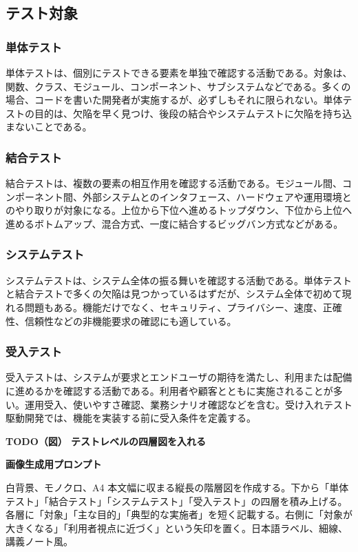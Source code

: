 \documentclass[uplatex,dvipdfmx,a4paper,11pt,nomag]{jsarticle}
\newenvironment{todobox}[2]{\par\medskip\begin{framed}\noindent\textbf{TODO（図） #1}\par\smallskip\noindent\textbf{画像生成用プロンプト}\par\smallskip\noindent #2\par\smallskip}{\end{framed}\par\medskip}
\begin{document}
\subsection{テスト対象}
\subsubsection{単体テスト}
単体テストは、個別にテストできる要素を単独で確認する活動である。対象は、関数、クラス、モジュール、コンポーネント、サブシステムなどである。多くの場合、コードを書いた開発者が実施するが、必ずしもそれに限られない。単体テストの目的は、欠陥を早く見つけ、後段の結合やシステムテストに欠陥を持ち込まないことである。

\subsubsection{結合テスト}
結合テストは、複数の要素の相互作用を確認する活動である。モジュール間、コンポーネント間、外部システムとのインタフェース、ハードウェアや運用環境とのやり取りが対象になる。上位から下位へ進めるトップダウン、下位から上位へ進めるボトムアップ、混合方式、一度に結合するビッグバン方式などがある。

\subsubsection{システムテスト}
システムテストは、システム全体の振る舞いを確認する活動である。単体テストと結合テストで多くの欠陥は見つかっているはずだが、システム全体で初めて現れる問題もある。機能だけでなく、セキュリティ、プライバシー、速度、正確性、信頼性などの非機能要求の確認にも適している。

\subsubsection{受入テスト}
受入テストは、システムが要求とエンドユーザの期待を満たし、利用または配備に進めるかを確認する活動である。利用者や顧客とともに実施されることが多い。運用受入、使いやすさ確認、業務シナリオ確認などを含む。受け入れテスト駆動開発では、機能を実装する前に受入条件を定義する。

\begin{todobox}{テストレベルの四層図を入れる}{白背景、モノクロ、A4 本文幅に収まる縦長の階層図を作成する。下から「単体テスト」「結合テスト」「システムテスト」「受入テスト」の四層を積み上げる。各層に「対象」「主な目的」「典型的な実施者」を短く記載する。右側に「対象が大きくなる」「利用者視点に近づく」という矢印を置く。日本語ラベル、細線、講義ノート風。}
\end{todobox}
\end{document}
